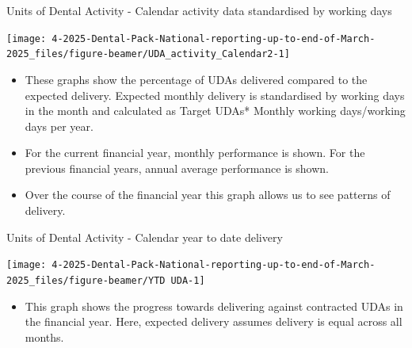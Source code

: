 \documentclass[
  8pt,
  ignorenonframetext,
  aspectratio = 169]{beamer}
\providecommand{\tightlist}{%
  \setlength{\itemsep}{0pt}\setlength{\parskip}{0pt}}
\begin{document}
\begin{frame}{Units of Dental Activity - Calendar activity data
standardised by working days}
\protect\hypertarget{units-of-dental-activity---calendar-activity-data-standardised-by-working-days}{}
\begin{center}\texttt{[image: 4-2025-Dental-Pack-National-reporting-up-to-end-of-March-2025\_files/figure-beamer/UDA\_activity\_Calendar2-1]} \end{center}

\begin{itemize}
\tightlist
\item
  These graphs show the percentage of UDAs delivered compared to the
  expected delivery. Expected monthly delivery is standardised by
  working days in the month and calculated as Target UDAs* Monthly
  working days/working days per year.
\item
  For the current financial year, monthly performance is shown. For the
  previous financial years, annual average performance is shown.
\item
  Over the course of the financial year this graph allows us to see
  patterns of delivery.
\end{itemize}
\end{frame}

\begin{frame}{Units of Dental Activity - Calendar year to date delivery}
\protect\hypertarget{units-of-dental-activity---calendar-year-to-date-delivery}{}
\begin{center}\texttt{[image: 4-2025-Dental-Pack-National-reporting-up-to-end-of-March-2025\_files/figure-beamer/YTD UDA-1]} \end{center}

\begin{itemize}
\tightlist
\item
  This graph shows the progress towards delivering against contracted
  UDAs in the financial year. Here, expected delivery assumes delivery
  is equal across all months.
\end{itemize}
\end{frame}
\end{document}
